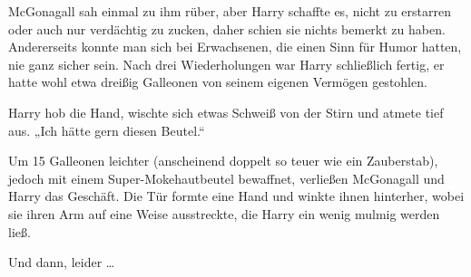 McGonagall sah einmal zu ihm rüber, aber Harry schaffte es, nicht zu erstarren oder auch nur verdächtig zu zucken, daher schien sie nichts bemerkt zu haben. Andererseits konnte man sich bei Erwachsenen, die einen Sinn für Humor hatten, nie ganz sicher sein. Nach drei Wiederholungen war Harry schließlich fertig, er hatte wohl etwa dreißig Galleonen von seinem eigenen Vermögen gestohlen.

Harry hob die Hand, wischte sich etwas Schweiß von der Stirn und atmete tief aus.
„Ich hätte gern diesen Beutel.“

Um 15 Galleonen leichter (anscheinend doppelt so teuer wie ein Zauberstab), jedoch mit einem Super-Mokehautbeutel  bewaffnet, verließen McGonagall und Harry das Geschäft. Die Tür formte eine Hand und winkte ihnen hinterher, wobei sie ihren Arm auf eine Weise ausstreckte, die Harry ein wenig mulmig werden ließ.

Und dann, leider …

